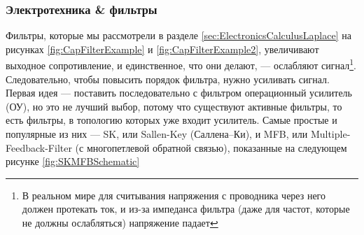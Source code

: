 \documentclass[a4paper, 10pt, final]{article} %
\begin{document}
    \subsubsection{Электротехника \& фильтры}
    Фильтры, которые мы рассмотрели в разделе \ref{sec:ElectronicsCalculusLaplace} на рисунках \ref{fig:CapFilterExample} и \ref{fig:CapFilterExample2}, увеличивают выходное сопротивление, и единственное, что они делают, --- ослабляют сигнал\footnote{В реальном мире для считывания напряжения с проводника через него должен протекать ток, и из-за импеданса фильтра (даже для частот, которые не должны ослабляться) напряжение падает}.
    Следовательно, чтобы повысить порядок фильтра, нужно усиливать сигнал.
    Первая идея --- поставить последовательно с фильтром операционный усилитель (ОУ), но это не лучший выбор, потому что существуют активные фильтры, то есть фильтры, в топологию которых уже входит усилитель.
    Самые простые и популярные из них --- SK, или Sallen-Key (Саллена--Ки), и MFB, или Multiple-Feedback-Filter (с многопетлевой обратной связью), показанные на следующем рисунке \ref{fig:SKMFBSchematic}
\end{document}
